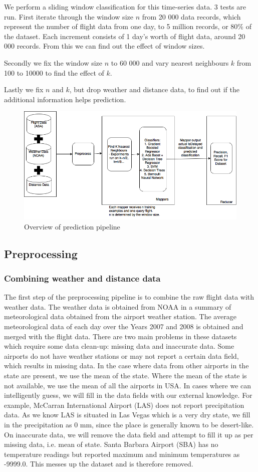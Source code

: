 \documentclass[letterpaper,11pt]{article}
\begin{document}
We perform a sliding window classification for this time-series data. 3 tests are run. First iterate through the window size $n$ from 20 000 data records, which represent the number of flight data from one day, to 5 million records, or 80\% of the dataset. Each increment consists of 1 day's worth of flight data, around 20 000 records. From this we can find out the effect of window sizes.

Secondly we fix the window size $n$ to 60 000 and vary nearest neighbours $k$ from 100 to 10000 to find the effect of $k$.

Lastly we fix $n$ and $k$, but drop weather and distance data, to find out if the additional information helps prediction.

\begin{figure}[htb]
\centering
\includegraphics[width=0.7\linewidth]{CS5228-final.png}
\caption{Overview of prediction pipeline}
\label{fig:overview}
\end{figure}

\subsection{Preprocessing}
\subsubsection{Combining weather and distance data}
The first step of the preprocessing pipeline is to combine the raw flight data with weather data. The weather data is obtained from NOAA in a summary of meteorological data obtained from the airport weather station. The average meteorological data of each day over the Years 2007 and 2008 is obtained and merged with the flight data. There are two main problems in these datasets which require some data clean-up: missing data and inaccurate data. Some airports do not have weather stations or may not report a certain data field, which results in missing data. In the case where data from other airports in the state are present, we use the mean of the state. Where the mean of the state is not available, we use the mean of all the airports in USA. In cases where we can intelligently guess, we will fill in the data fields with our external knowledge. For example, McCarran International Airport (LAS) does not report precipitation data. As we know LAS is situated in Las Vegas which is a very dry state, we fill in the precipitation as 0 mm, since the place is generally known to be desert-like. On inaccurate data, we will remove the data field and attempt to fill it up as per missing data, i.e. mean of state. Santa Barbara Airport (SBA) has no temperature readings but reported maximum and minimum temperatures as -9999.0. This messes up the dataset and is therefore removed. 
\end{document}

